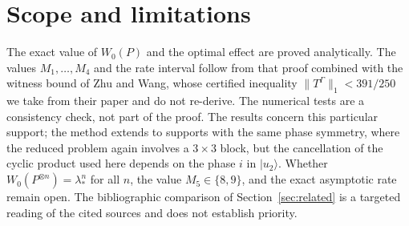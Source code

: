 \documentclass[11pt,a4paper]{article}
\theoremstyle{definition}
\theoremstyle{plain}
\newcommand{\ket}[1]{\lvert#1\rangle}
\newcommand{\norm}[1]{\lVert#1\rVert}
\begin{document}
\section{Scope and limitations}\label{sec:scope}
The exact value of $W_0(P)$ and the optimal effect are proved analytically.
The values $M_1,\dots,M_4$ and the rate interval follow from that proof
combined with the witness bound of Zhu and Wang, whose certified inequality
$\norm{T^\Gamma}_1<391/250$ we take from their paper and do not re-derive.
The numerical tests are a consistency check, not part of the proof. The
results concern this particular support; the method extends to supports with
the same phase symmetry, where the reduced problem again involves a $3\times3$
block, but the cancellation of the cyclic product used here depends on the
phase $i$ in $\ket{u_2}$. Whether $W_0(P^{\otimes n})=\lambda_*^n$ for all
$n$, the value $M_5\in\{8,9\}$, and the exact asymptotic rate remain open. The
bibliographic comparison of Section~\ref{sec:related} is a targeted reading of
the cited sources and does not establish priority.
\end{document}
